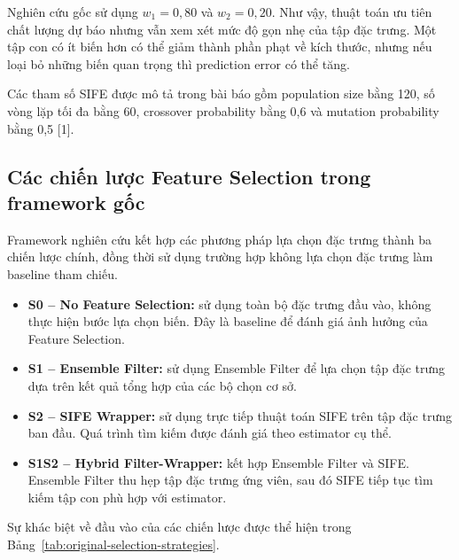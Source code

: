 Nghiên cứu gốc sử dụng $w_1=0{,}80$ và $w_2=0{,}20$. Như vậy,
thuật toán ưu tiên chất lượng dự báo nhưng vẫn xem xét mức độ
gọn nhẹ của tập đặc trưng. Một tập con có ít biến hơn có thể
giảm thành phần phạt về kích thước, nhưng nếu loại bỏ những
biến quan trọng thì prediction error có thể tăng.

Các tham số SIFE được mô tả trong bài báo gồm population size
bằng 120, số vòng lặp tối đa bằng 60, crossover probability
bằng 0,6 và mutation probability bằng 0,5 [1].

\subsection{Các chiến lược Feature Selection trong framework gốc}
\label{subsec:selection-strategies-original}

Framework nghiên cứu kết hợp các phương pháp lựa chọn đặc trưng
thành ba chiến lược chính, đồng thời sử dụng trường hợp không lựa
chọn đặc trưng làm baseline tham chiếu.

\begin{itemize}
    \item \textbf{S0 -- No Feature Selection:} sử dụng toàn bộ
    đặc trưng đầu vào, không thực hiện bước lựa chọn biến.
    Đây là baseline để đánh giá ảnh hưởng của Feature Selection.

    \item \textbf{S1 -- Ensemble Filter:} sử dụng Ensemble Filter
    để lựa chọn tập đặc trưng dựa trên kết quả tổng hợp của các
    bộ chọn cơ sở.

    \item \textbf{S2 -- SIFE Wrapper:} sử dụng trực tiếp thuật toán
    SIFE trên tập đặc trưng ban đầu. Quá trình tìm kiếm được đánh
    giá theo estimator cụ thể.

    \item \textbf{S1S2 -- Hybrid Filter-Wrapper:} kết hợp Ensemble
    Filter và SIFE. Ensemble Filter thu hẹp tập đặc trưng ứng viên,
    sau đó SIFE tiếp tục tìm kiếm tập con phù hợp với estimator.
\end{itemize}

Sự khác biệt về đầu vào của các chiến lược được thể hiện trong
Bảng~\ref{tab:original-selection-strategies}.

